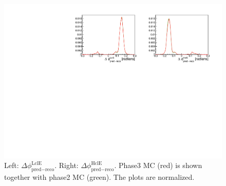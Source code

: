 \documentclass[a4paper,11pt,twosided,final,german,openbib,pdftex,listof=totoc,bibliography=totoc]{scrbook}
\begin{document}
\begin{appendix}
\begin{figure}[h!]
	\centering
	\includegraphics[width=\textwidth]{Plots/comp/cb2bMC.pdf}
	\caption[Normalized b2bClusterPhi - clusterPhi For Phase2 And Phase3 MC]{Left: $\Delta \phi _{\textrm{pred} - \textrm{reco}}^{\textrm{LclE}}$. Right:  $\Delta \phi _{\textrm{pred} - \textrm{reco}}^{\textrm{HclE}}$. Phase3 MC (red) is shown together with phase2 MC (green). The plots are normalized.}
	\label{fig:Cb2bMC}
\end{figure}

\end{appendix}
\end{document}
